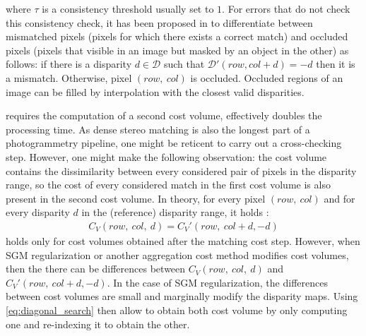 where $\tau$ is a consistency threshold usually set to $1$. For errors that do not check this consistency check, it has been proposed in \cite{hirschmuller_stereo_2008} to differentiate between mismatched pixels (pixels for which there exists a correct match) and occluded pixels (pixels that visible in an image but masked by an object in the other) as follows: if there is a disparity $d\in\mathcal{D}$ such that $\mathcal{D}'(row, col+d)=-d$ then it is a mismatch. Otherwise, pixel $(row, ~col)$ is occluded. Occluded regions of an image can be filled by interpolation with the closest valid disparities.  

\begin{remark}
      requires the computation of a second cost volume, effectively doubles the processing time. As dense stereo matching is also the longest part of a photogrammetry pipeline, one might be reticent to carry out a cross-checking step. However, one might make the following observation: the cost volume contains the dissimilarity between every considered pair of pixels in the disparity range, so the cost of every considered match in the first cost volume is also present in the second cost volume. In theory, for every pixel $(row, ~col)$ and for every disparity $d$ in the (reference) disparity range, it holds \cite{bebis_mutual_2008}:
     \begin{align}\label{eq:diagonal_search}
         C_V(row,~col,~d) = C_V'(row,~col+d, -d)
     \end{align}
      holds only for cost volumes obtained after the matching cost step. However, when SGM regularization or another aggregation cost method modifies cost volumes, then the there can be differences between $C_V(row,~col,~d)$ and $C_V'(row,~col+d, -d)$. In the case of SGM regularization, the differences between cost volumes are small and marginally modify the disparity maps. Using \eqref{eq:diagonal_search} then allow to obtain both cost volume by only computing one and re-indexing it to obtain the other. 
\end{remark}

